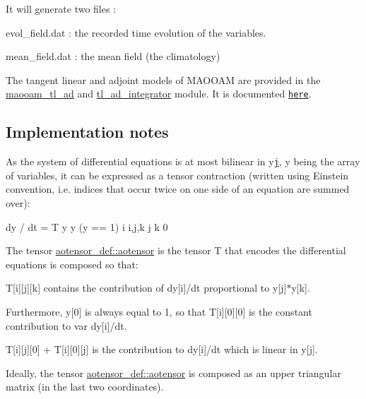 It will generate two files \-:
\begin{DoxyItemize}
\item evol\-\_\-field.\-dat \-: the recorded time evolution of the variables.
\item mean\-\_\-field.\-dat \-: the mean field (the climatology)
\end{DoxyItemize}

The tangent linear and adjoint models of M\-A\-O\-O\-A\-M are provided in the \hyperlink{classmaooam__tl__ad}{maooam\-\_\-tl\-\_\-ad} and \hyperlink{classtl__ad__integrator}{tl\-\_\-ad\-\_\-integrator} module. It is documented \href{./md_README_TL_AD.html}{\tt here}. 



\subsection*{Implementation notes}

As the system of differential equations is at most bilinear in y\href{j=1..n}{\tt j}, y being the array of variables, it can be expressed as a tensor contraction (written using Einstein convention, i.\-e. indices that occur twice on one side of an equation are summed over)\-: \begin{DoxyVerb}dy  / dt =  T        y   y      (y  == 1)
  i          i,j,k    j   k       0
\end{DoxyVerb}


The tensor \hyperlink{classaotensor__def_a0dc43bc9294a18f2fe57b67489f1702f}{aotensor\-\_\-def\-::aotensor} is the tensor T that encodes the differential equations is composed so that\-:


\begin{DoxyItemize}
\item T\mbox{[}i\mbox{]}\mbox{[}j\mbox{]}\mbox{[}k\mbox{]} contains the contribution of dy\mbox{[}i\mbox{]}/dt proportional to y\mbox{[}j\mbox{]}$\ast$y\mbox{[}k\mbox{]}.
\item Furthermore, y\mbox{[}0\mbox{]} is always equal to 1, so that T\mbox{[}i\mbox{]}\mbox{[}0\mbox{]}\mbox{[}0\mbox{]} is the constant contribution to var dy\mbox{[}i\mbox{]}/dt.
\item T\mbox{[}i\mbox{]}\mbox{[}j\mbox{]}\mbox{[}0\mbox{]} + T\mbox{[}i\mbox{]}\mbox{[}0\mbox{]}\mbox{[}j\mbox{]} is the contribution to dy\mbox{[}i\mbox{]}/dt which is linear in y\mbox{[}j\mbox{]}.
\end{DoxyItemize}

Ideally, the tensor \hyperlink{classaotensor__def_a0dc43bc9294a18f2fe57b67489f1702f}{aotensor\-\_\-def\-::aotensor} is composed as an upper triangular matrix (in the last two coordinates).

